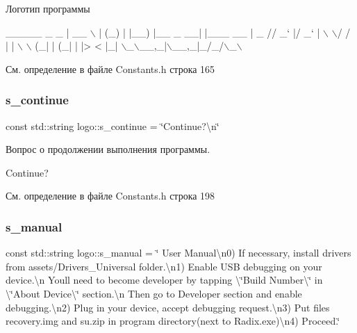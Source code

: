 Логотип программы 
\begin{DoxyCode}
 \_\_\_\_\_           \_ \_      
|  \_\_ \(\backslash\)         | (\_)     
| |\_\_) |\_\_ \_  \_\_| |\_\_\_  \_\_
|  \_  \textcolor{comment}{// \_` |/ \_` | \(\backslash\) \(\backslash\)/ /}
| | \(\backslash\) \(\backslash\) (\_| | (\_| | |>  < 
|\_|  \(\backslash\)\_\(\backslash\)\_\_,\_|\(\backslash\)\_\_,\_|\_/\_/\(\backslash\)\_\(\backslash\)
\end{DoxyCode}
 

См. определение в файле Constants.\+h строка 165

\mbox{\label{namespacelogo_a6bb2bd19b13072f69598ed9f64b77350}} 
\subsubsection{\texorpdfstring{s\+\_\+continue}{s\_continue}}
{\footnotesize\ttfamily const std\+::string logo\+::s\+\_\+continue = \char`\"{}Continue?\textbackslash{}n\char`\"{}}

Вопрос о продолжении выполнения программы. 
\begin{DoxyCode}
Continue?
\end{DoxyCode}
 

См. определение в файле Constants.\+h строка 198

\mbox{\label{namespacelogo_a0a26b9dd91d59364dce6d78c217af1a0}} 
\subsubsection{\texorpdfstring{s\+\_\+manual}{s\_manual}}
{\footnotesize\ttfamily const std\+::string logo\+::s\+\_\+manual = \char`\"{} User Manual\textbackslash{}n0) If necessary, install drivers from assets/Drivers\+\_\+\+Universal folder.\textbackslash{}n1) Enable U\+SB debugging on your device.\textbackslash{}n You\textquotesingle{}ll need to become developer by tapping \textbackslash{}\char`\"{}Build Number\textbackslash{}\char`\"{} in \textbackslash{}\char`\"{}About Device\textbackslash{}\char`\"{} section.\textbackslash{}n Then go to Developer section and enable debugging.\textbackslash{}n2) Plug in your device, accept debugging request.\textbackslash{}n3) Put files \textquotesingle{}recovery.\+img\textquotesingle{} and \textquotesingle{}su.\+zip\textquotesingle{} in program directory(next to Radix.\+exe)\textbackslash{}n4) Proceed.\char`\"{}}

